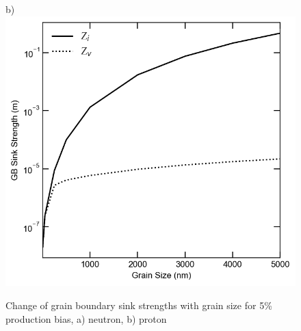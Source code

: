\documentclass[utf8]{frontiersSCNS} %
\begin{document}
\begin{figure}[h!]
        b)\includegraphics[scale=0.55]{sink_strength_moose_high_neutron_5_Z_scaled}
        \caption{Change of grain boundary sink strengths with grain size for 5\% production bias, a) neutron, b) proton}
        \label{figure:sink_strengths_neutron_5_1e-6}
    \end{figure}
\end{document}
